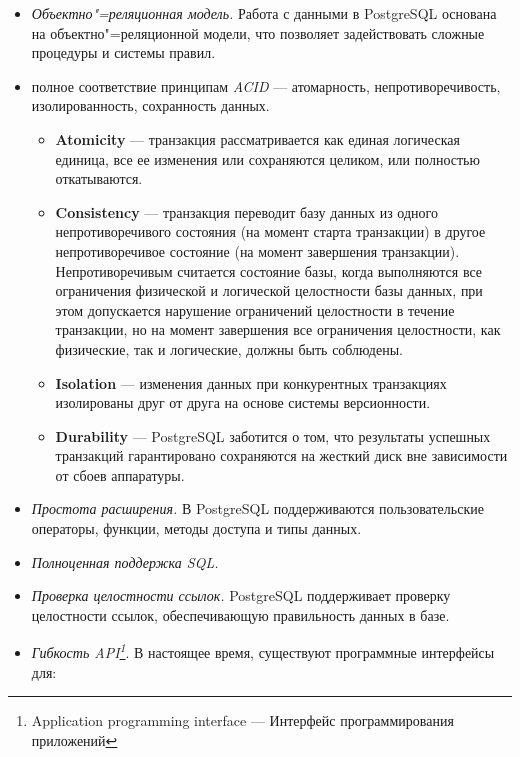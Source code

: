 \documentclass[a4paper,12pt,notitlepage,headsepline,pdftex]{scrartcl}
\begin{document}
  \begin{itemize}
    \item \emph{Объектно"=реляционная модель.}
      Работа с данными в PostgreSQL основана на объектно"=реляционной модели,
      что позволяет задействовать сложные процедуры и системы правил.
    \item полное соответствие принципам \emph{ACID} --- атомарность,
      непротиворечивость, изолированность, сохранность данных.
      \begin{itemize}
        \item \textbf{Atomicity} --- транзакция рассматривается как единая
          логическая единица, все ее изменения или сохраняются целиком, или
          полностью откатываются.
        \item \textbf{Consistency} --- транзакция переводит базу данных из
          одного  непротиворечивого состояния (на момент старта транзакции) в
          другое непротиворечивое состояние (на момент завершения транзакции).
          Непротиворечивым считается состояние базы, когда выполняются все
          ограничения физической и логической целостности базы данных, при
          этом допускается нарушение ограничений целостности в течение
          транзакции, но на момент завершения все ограничения целостности, как
          физические, так и логические, должны быть соблюдены.
        \item \textbf{Isolation} --- изменения данных при конкурентных
          транзакциях изолированы друг от друга на основе системы
          версионности.
        \item \textbf{Durability} --- PostgreSQL заботится о том, что
          результаты успешных транзакций гарантировано сохраняются на жесткий
          диск вне зависимости от сбоев аппаратуры.
      \end{itemize}
    \item \emph{Простота расширения.}
      В PostgreSQL поддерживаются пользовательские операторы, функции, методы
      доступа и типы данных.
    \item \emph{Полноценная поддержка SQL.}
    \item \emph{Проверка целостности ссылок.}
      PostgreSQL поддерживает проверку целостности ссылок, обеспечивающую
      правильность данных в базе.
    \item \emph{Гибкость API\footnote{Application programming interface ---
        \label{p:langs}
      Интерфейс программирования приложений}}.
      В настоящее время, существуют программные интерфейсы для:


\end{itemize}
\end{document}
